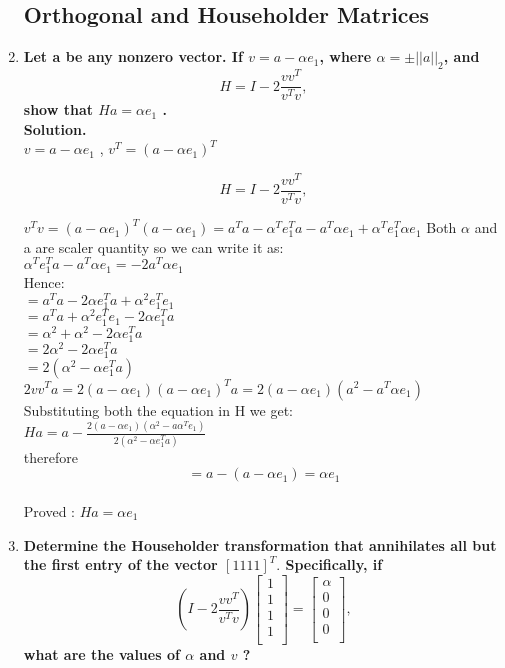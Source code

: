 \documentclass[12pt, oneside]{article}   	%
\begin{document}
\begin{enumerate}
\begin{enumerate}
		
\end{enumerate}

\subsection*{Orthogonal and Householder Matrices}
	\item \textbf{Let a be any nonzero vector. If $v= a- \alpha e_1$, where $\alpha= \pm ||a||_2$, and $$H=I - 2\frac{vv^T}{v^Tv},$$ show that $Ha=\alpha e_1$ .}\\
	
	\textbf{Solution.}\\
	
	$v= a- \alpha e_1$ , $v^T=( a- \alpha e_1)^T$
	
	$$H=I - 2\frac{vv^T}{v^Tv},$$
	
	$v^Tv=(a- \alpha e_1)^T( a- \alpha e_1)=a^Ta-\alpha^T e_1^Ta-a^T\alpha e_1 +\alpha^T e_1^T\alpha e_1 $
	Both $\alpha$ and a are scaler quantity so we can write it as:\\
	$\alpha^T e_1^Ta-a^T\alpha e_1=-2a^T\alpha e_1$\\
	
	Hence:\\
	$=a^Ta-2\alpha e_1^Ta+\alpha^2 e_1^Te_1 $\\
	$=a^Ta+\alpha^2 e_1^Te_1 -2\alpha e_1^Ta$\\
	$=\alpha^2+\alpha^2-2\alpha e_1^Ta$\\
	$=2\alpha^2-2\alpha e_1^Ta$\\
	$=2(\alpha^2-\alpha e_1^Ta)$\\
	
	
	$2vv^Ta =2(a- \alpha e_1)( a- \alpha e_1)^Ta =2(a- \alpha e_1)( a^2- a^T\alpha e_1)$\\
	
	Substituting both the equation in H we get: \\
	
	$Ha=a- \frac{2(a- \alpha e_1)( \alpha^2- a\alpha^T e_1)}{2(\alpha^2-\alpha e_1^Ta)}$\\
	
	therefore $$=a- (a-\alpha e_1)= \alpha e_1$$\\
	
	Proved :   $Ha=\alpha e_1$
		
	
	
	\item \textbf{Determine the Householder transformation that annihilates all but the first entry of the vector $[1 1 1 1]^T.$ Specifically, if $$(I - 2\frac{vv^T}{v^Tv})
	 \left [\begin{array}{c} 1\\1\\1\\1\\
		\end{array}\right]= \left [\begin{array}{c} \alpha\\0\\0\\0\\
		\end{array}\right], $$what are the values of $\alpha$ and $v$ ?}\\
	

\end{enumerate}
\end{document}
